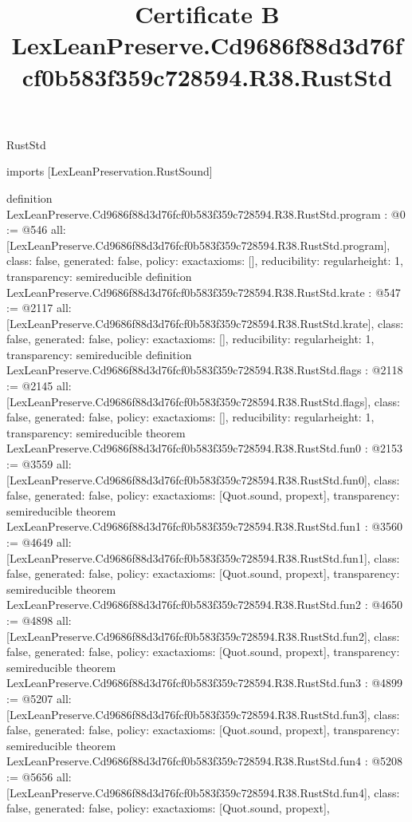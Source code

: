 \begin{lexlean}{RustStd}
\title{Certificate B LexLeanPreserve.Cd9686f88d3d76fcf0b583f359c728594.R38.RustStd}
\begin{coremodule}
imports [LexLeanPreservation.RustSound]

definition LexLeanPreserve.Cd9686f88d3d76fcf0b583f359c728594.R38.RustStd.program : @0 := @546 {
  all: [LexLeanPreserve.Cd9686f88d3d76fcf0b583f359c728594.R38.RustStd.program],
  class: false,
  generated: false,
  policy: exact{axioms: []},
  reducibility: regular{height: 1},
  transparency: semireducible
}
definition LexLeanPreserve.Cd9686f88d3d76fcf0b583f359c728594.R38.RustStd.krate : @547 := @2117 {
  all: [LexLeanPreserve.Cd9686f88d3d76fcf0b583f359c728594.R38.RustStd.krate],
  class: false,
  generated: false,
  policy: exact{axioms: []},
  reducibility: regular{height: 1},
  transparency: semireducible
}
definition LexLeanPreserve.Cd9686f88d3d76fcf0b583f359c728594.R38.RustStd.flags : @2118 := @2145 {
  all: [LexLeanPreserve.Cd9686f88d3d76fcf0b583f359c728594.R38.RustStd.flags],
  class: false,
  generated: false,
  policy: exact{axioms: []},
  reducibility: regular{height: 1},
  transparency: semireducible
}
theorem LexLeanPreserve.Cd9686f88d3d76fcf0b583f359c728594.R38.RustStd.fun0 : @2153 := @3559 {
  all: [LexLeanPreserve.Cd9686f88d3d76fcf0b583f359c728594.R38.RustStd.fun0],
  class: false,
  generated: false,
  policy: exact{axioms: [Quot.sound, propext]},
  transparency: semireducible
}
theorem LexLeanPreserve.Cd9686f88d3d76fcf0b583f359c728594.R38.RustStd.fun1 : @3560 := @4649 {
  all: [LexLeanPreserve.Cd9686f88d3d76fcf0b583f359c728594.R38.RustStd.fun1],
  class: false,
  generated: false,
  policy: exact{axioms: [Quot.sound, propext]},
  transparency: semireducible
}
theorem LexLeanPreserve.Cd9686f88d3d76fcf0b583f359c728594.R38.RustStd.fun2 : @4650 := @4898 {
  all: [LexLeanPreserve.Cd9686f88d3d76fcf0b583f359c728594.R38.RustStd.fun2],
  class: false,
  generated: false,
  policy: exact{axioms: [Quot.sound, propext]},
  transparency: semireducible
}
theorem LexLeanPreserve.Cd9686f88d3d76fcf0b583f359c728594.R38.RustStd.fun3 : @4899 := @5207 {
  all: [LexLeanPreserve.Cd9686f88d3d76fcf0b583f359c728594.R38.RustStd.fun3],
  class: false,
  generated: false,
  policy: exact{axioms: [Quot.sound, propext]},
  transparency: semireducible
}
theorem LexLeanPreserve.Cd9686f88d3d76fcf0b583f359c728594.R38.RustStd.fun4 : @5208 := @5656 {
  all: [LexLeanPreserve.Cd9686f88d3d76fcf0b583f359c728594.R38.RustStd.fun4],
  class: false,
  generated: false,
  policy: exact{axioms: [Quot.sound, propext]},
}
\end{coremodule}
\end{lexlean}
